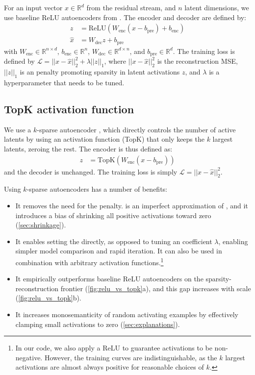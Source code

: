     
For an input vector $x \in \mathbb{R}^{d}$ from the residual stream, and $n$ latent dimensions, we use baseline ReLU autoencoders from \citep{bricken2023monosemanticity}. The encoder and decoder are defined by:
\begin{equation}
\begin{aligned}
    z &= \text{ReLU}(W_\text{enc} (x - b_\text{pre}) + b_\text{enc}) \\
    \hat{x} &= W_\text{dec} z + b_\text{pre}
\end{aligned}
\end{equation}
with $W_\text{enc} \in \mathbb{R}^{n \times d}$, $b_\text{enc} \in \mathbb{R}^{n}$, $W_\text{dec} \in \mathbb{R}^{d \times n}$, and $b_\text{pre} \in \mathbb{R}^{d}$. The training loss is defined by $\mathcal{L} = ||x - \hat{x}||^2_2 + \lambda ||z||_1$, where $||x - \hat{x}||^2_2$ is the reconstruction MSE, $||z||_1$ is an \Lone penalty promoting sparsity in latent activations $z$, and $\lambda$ is a hyperparameter that needs to be tuned.


\subsection{TopK activation function}

We use a $k$-sparse autoencoder \citep{makhzani2013k}, which directly controls the number of active latents by using an activation function (TopK) that only keeps the $k$ largest latents, zeroing the rest. The encoder is thus defined as:
\begin{equation}
\begin{aligned}
    z &= \text{TopK}(W_\text{enc} (x - b_\text{pre}))
\end{aligned}
\end{equation}
and the decoder is unchanged. The training loss is simply $\mathcal{L} = ||x - \hat{x}||^2_2$.

Using $k$-sparse autoencoders has a number of benefits:
\begin{itemize}
\item It removes the need for the \Lone penalty. \Lone is an imperfect approximation of \Lzero, and it introduces a bias of shrinking all positive activations toward zero
(\autoref{sec:shrinkage}).
\item It enables setting the \Lzero directly, as opposed to tuning an \Lone coefficient $\lambda$, enabling simpler model comparison and rapid iteration.  It can also be used in combination with arbitrary activation functions.\footnote{In our code, we also apply a ReLU to guarantee activations to be non-negative.  However, the training curves are indistinguishable, as the $k$ largest activations are almost always positive for reasonable choices of $k$.} %
\item It empirically outperforms baseline ReLU autoencoders on the sparsity-reconstruction frontier (\autoref{fig:relu_vs_topk}a), and this gap increases with scale (\autoref{fig:relu_vs_topk}b). %
\item It increases monosemanticity of random activating examples by  effectively clamping small activations to zero
(\autoref{sec:explanations}).
\end{itemize}
 

